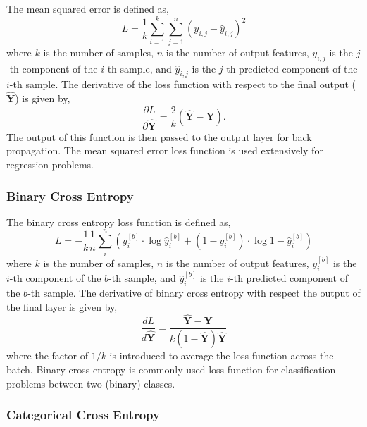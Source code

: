 \documentclass[twocolumn,pra,floatfix]{revtex4-2}
\begin{document}
                The mean squared error is defined as,
                \begin{equation}
                    L = \frac{1}{k} \sum_{i=1}^{k} \sum_{j=1}^{n} (y_{i,j} - \hat{y}_{i,j})^2\label{eq:loss}
                \end{equation}
                where $k$ is the number of samples, $n$ is the number of output features, $y_{i,j}$ is the $j$-th component of the $i$-th sample, and $\hat{y}_{i,j}$ is the $j$-th predicted component of the $i$-th sample. The derivative of the loss function with respect to the final output ($\mathbf{\hat{Y}}$) is given by,
                \begin{equation}
                    \frac{\partial L}{\partial \mathbf{\hat{Y}}} = \frac{2}{k} (\mathbf{\hat{Y}} - \mathbf{Y}).
                \end{equation}
                The output of this function is then passed to the output layer for back propagation. The mean squared error loss function is used extensively for regression problems.

            \subsubsection{Binary Cross Entropy\label{bce}}
                The binary cross entropy loss function is defined as,
                \begin{equation}
                    L = -\frac{1}{k}\frac{1}{n}\sum^n_{i}\left( y^{[b]}_i 
                    \cdot \log{\hat{y}^{[b]}_i} + (1 - y^{[b]}_i) \cdot 
                    \log{1 - \hat{y}^{[b]}_i} \right) 
                \end{equation}
                where $k$ is the number of samples, $n$ is the number of output features, $y_{i}^{[b]}$ is the $i$-th component of the $b$-th sample, and $\hat{y}_{i}^{[b]}$ is the $i$-th predicted component of the $b$-th sample. The derivative of binary cross entropy with
                respect the output of the final layer is given by,
                \begin{equation}
                    \frac{dL}{d\mathbf{\hat{Y}}} = \frac{\mathbf{\hat{Y}} - \mathbf{Y}}{k(1 - \mathbf{\hat{Y}}) \mathbf{\hat{Y}}}
                \end{equation}
                where the factor of $1/k$ is introduced to average the loss function across the batch. Binary cross entropy is commonly used loss function for classification problems between two (binary) classes.
            \subsubsection{Categorical Cross Entropy}\label{cce}
\end{document}
